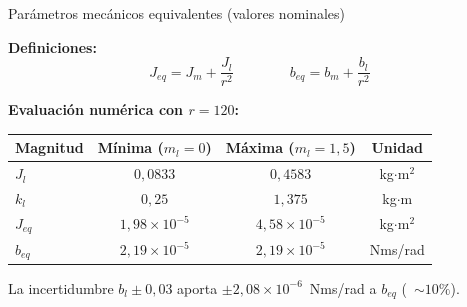 \documentclass[aspectratio=169,t]{beamer}
\begin{document}
\begin{frame}{Parámetros mecánicos equivalentes (valores nominales)}
\vspace{3mm}

\textbf{Definiciones:}
\begin{equation*}
J_{eq} = J_m + \frac{J_l}{r^2}
\qquad\qquad
b_{eq} = b_m + \frac{b_l}{r^2}
\end{equation*}

\vspace{4mm}
\textbf{Evaluación numérica con $r=120$:}\par
\vspace{2mm}
\centering
\renewcommand{\arraystretch}{1.25}
\begin{tabular}{|l|c|c|c|}
\hline
\textbf{Magnitud} & \textbf{Mínima ($m_l=0$)} & \textbf{Máxima ($m_l=1{,}5$)} & \textbf{Unidad} \\
\hline
$J_l$    & $0{,}0833$              & $0{,}4583$              & kg$\cdot$m$^2$ \\
$k_l$    & $0{,}25$                & $1{,}375$               & kg$\cdot$m \\
$J_{eq}$ & $1{,}98\times 10^{-5}$  & $4{,}58\times 10^{-5}$  & kg$\cdot$m$^2$ \\
$b_{eq}$ & $2{,}19\times 10^{-5}$  & $2{,}19\times 10^{-5}$  & Nms/rad \\
\hline
\end{tabular}

\vspace{3mm}
{\small La incertidumbre $b_l\pm 0{,}03$ aporta $\pm 2{,}08{\times}10^{-6}$~Nms/rad a $b_{eq}$ (~$\sim 10\%$).}
\end{frame}
\end{document}
